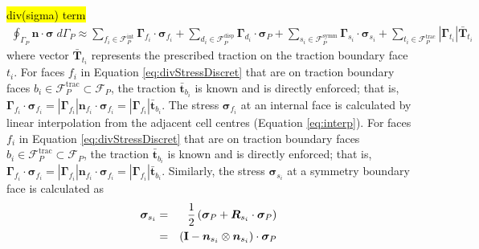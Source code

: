 \documentclass[sn-mathphys,Numbered]{sn-jnl}%
\newcommand{\bb}{\boldsymbol}
\begin{document}
\hl{div(sigma) term}
\begin{eqnarray} \label{eq:divStressDiscret}
	\oint_{\Gamma_P} \bb{n} \cdot \bb{\sigma}  \; d\Gamma_P
	\approx 
	\sum_{f_i \in \mathcal{F}_P^{\text{int}}} \bb{\Gamma}_{f_i} \cdot \bb{\sigma}_{f_i}
	+ \sum_{d_i \in \mathcal{F}_P^{\text{disp}}} \bb{\Gamma}_{d_i} \cdot \bb{\sigma}_{P}
	+ \sum_{s_i \in \mathcal{F}_P^{\text{symm}}} \bb{\Gamma}_{s_i} \cdot \bb{\sigma}_{s_i}
	+ \sum_{t_i \in \mathcal{F}_P^{\text{trac}}} |\bb{\Gamma}_{t_i}| \bar{\bb{T}}_{t_i}
\end{eqnarray}
where vector $\bar{\bb{T}}_{t_i}$ represents the prescribed traction on the traction boundary face $t_i$.
For faces $f_i$ in Equation \ref{eq:divStressDiscret} that are on traction boundary faces $b_i \in \mathcal{F}_P^{\text{trac}} \subset \mathcal{F}_P$, 
the traction $\bar{\bb{t}}_{b_i}$ is known and is directly enforced; that is, $\bb{\Gamma}_{f_i} \cdot \bb{\sigma}_{f_i} = |\bb{\Gamma}_{f_i}| \bb{n}_{f_i} \cdot \bb{\sigma}_{f_i} =  |\bb{\Gamma}_{f_i}| \bar{\bb{t}}_{b_i}$.
The stress $\bb{\sigma}_{f_i}$ at an internal face is calculated by linear interpolation from the adjacent cell centres (Equation \ref{eq:interp}).
For faces $f_i$ in Equation \ref{eq:divStressDiscret} that are on traction boundary faces $b_i \in \mathcal{F}_P^{\text{trac}} \subset \mathcal{F}_P$, the traction $\bar{\bb{t}}_{b_i}$ is known and is directly enforced; that is, $\bb{\Gamma}_{f_i} \cdot \bb{\sigma}_{f_i} = |\bb{\Gamma}_{f_i}| \bb{n}_{f_i} \cdot \bb{\sigma}_{f_i} =  |\bb{\Gamma}_{f_i}| \bar{\bb{t}}_{b_i}$.
Similarly, the stress $\bb{\sigma}_{s_i}$ at a symmetry boundary face is calculated as
\begin{eqnarray} \label{eq:symm}
	\bb{\sigma}_{s_i}
		&=& \frac{1}{2} \left (\bb{\sigma}_P + \bb{R}_{s_i} \cdot \bb{\sigma}_{P} \right) \notag \\
		&=& \left (\textbf{I} - \bb{n}_{s_i} \otimes \bb{n}_{s_i} \right) \cdot \bb{\sigma}_P
\end{eqnarray}
\end{document}

